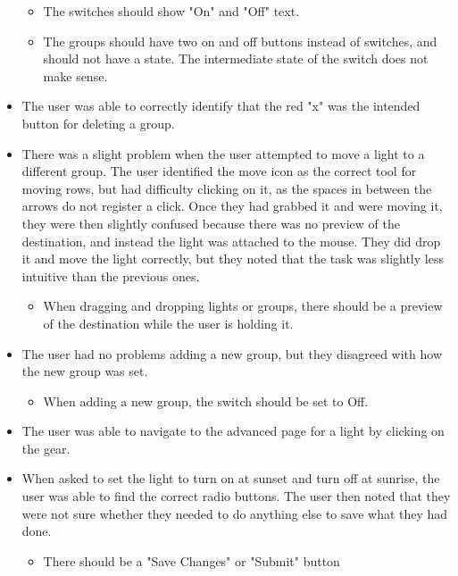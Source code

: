 \documentclass[10pt,draftclsnofoot,onecolumn]{IEEEtran}
\begin{document}
\begin{itemize}
\begin{itemize}
            \item The switches should show "On" and "Off" text.
            \item The groups should have two on and off buttons instead of
                switches, and should not have a state. The intermediate state
                of the switch does not make sense.
        \end{itemize}
    \item The user was able to correctly identify that the red "x" was the
        intended button for deleting a group.
    \item There was a slight problem when the user attempted to move a light to
        a different group. The user identified the move icon as the correct
        tool for moving rows, but had difficulty clicking on it, as the spaces
        in between the arrows do not register a click. Once they had grabbed it
        and were moving it, they were then slightly confused because there was
        no preview of the destination, and instead the light was attached to
        the mouse. They did drop it and move the light correctly, but they
        noted that the task was slightly less intuitive than the previous ones.
        \begin{itemize}
            \item When dragging and dropping lights or groups, there should be
                a preview of the destination while the user is holding it.
        \end{itemize}
    \item The user had no problems adding a new group, but they disagreed with
        how the new group was set.
        \begin{itemize}
            \item When adding a new group, the switch should be set to Off.
        \end{itemize}
    \item The user was able to navigate to the advanced page for a light by
        clicking on the gear.
    \item When asked to set the light to turn on at sunset and turn off at
        sunrise, the user was able to find the correct radio buttons. The user
        then noted that they were not sure whether they needed to do anything
        else to save what they had done.
        \begin{itemize}
            \item There should be a "Save Changes" or "Submit" button
        \end{itemize}

\end{itemize}
\end{document}
